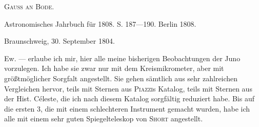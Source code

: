 \centerline{\textsc{Gauß an Bode.}}

\medskip
Astronomisches Jahrbuch für 1808. S. 187---190. Berlin 1808.

\medskip
\begin{flushright}
Braunschweig, 30. September 1804.
\end{flushright}

Ew. --- erlaube ich mir, hier alle meine bisherigen Beobachtungen der Juno vorzulegen. Ich habe sie zwar nur mit dem Kreismikrometer, aber mit größtmöglicher Sorgfalt angestellt. Sie gehen sämtlich aus sehr zahlreichen Vergleichen hervor, teils mit Sternen aus \textsc{Piazzi}s Katalog, teils mit Sternen aus der Hist. Céleste, die ich nach diesem Katalog sorgfältig reduziert habe. Bis auf die ersten 3, die mit einem schlechteren Instrument gemacht wurden, habe ich alle mit einem sehr guten Spiegelteleskop von \textsc{Short} angestellt.

